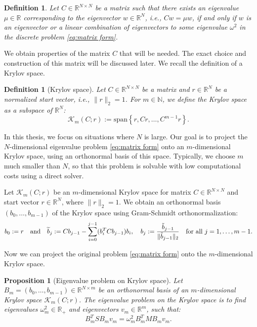 \documentclass[a4paper,11pt,bibliography=totoc,listof=totoc,headinclude=true,cleardoublepage=empty,oneside]{scrbook}
\newtheorem{definition}[theorem]{Definition}
\newtheorem{prop}[theorem]{Proposition}
\newcommand{\R}{\mathbb{R}}
\newcommand{\N}{\mathbb{N}}
\begin{document}
\begin{definition}\label{def:C}
    Let $C \in \R^{N\times N}$ be a matrix such that there exists an eigenvalue $\mu \in \R$ corresponding to the eigenvector $w\in \R^N$, i.e., $Cw = \mu w$, if and only if $w$ is an eigenvector or a linear combination of eigenvectors to some eigenvalue $\omega^2$ in the discrete problem \eqref{eq:matrix form}.
\end{definition}

We obtain properties of the matrix $C$ that will be needed. The exact choice and construction of this matrix will be discussed later. We recall the definition of a Krylov space.

\begin{definition}[Krylov space]
    Let $C \in \R^{N \times N}$ be a matrix and $r\in \R^N$ be a normalized start vector, i.e., $\|r\|_2=1$. For $m\in \N$, we define the Krylov space as a subspace of $\R^N$:
    \begin{equation*}
        \mathcal{K}_m(C; r) := \mathrm{span}\left\{r, Cr, \dots, C^{m-1}r\right\}.
    \end{equation*}
\end{definition}

In this thesis, we focus on situations where $N$ is large. Our goal is to project the $N$-dimensional eigenvalue problem \eqref{eq:matrix form} onto an $m$-dimensional Krylov space, using an orthonormal basis of this space. Typically, we choose $m$ much smaller than $N$, so that this problem is solvable with low computational costs using a direct solver.

Let $\mathcal{K}_m(C; r)$ be an $m$-dimensional Krylov space for matrix $C\in \R^{N\times N}$ and start vector $r\in \R^N$, where $\|r\|_2=1$. We obtain an orthonormal basis $(b_0, \dots, b_{m-1})$ of the Krylov space using Gram-Schmidt orthonormalization:
\begin{equation*}
    b_0 := r \quad \text{and} \quad \widetilde{b}_{j} := Cb_{j-1} - \sum_{i=0}^{j-1} (b_i^T C b_{j-1}) b_i, \quad b_j := \frac{\Tilde{b}_{j-1}}{\|\Tilde{b}_{j-1}\|_2} \quad \text{for all } j=1, \dots, m-1. 
\end{equation*}


Now we can project the original problem \eqref{eq:matrix form} onto the $m$-dimensional Krylov space.

\begin{prop}[Eigenvalue problem on Krylov space]
    Let $B_m = (b_0, \dots, b_{m-1}) \in \R^{N\times m}$ be an orthonormal basis of an $m$-dimensional Krylov space $\mathcal{K}_m(C; r)$. The eigenvalue problem on the Krylov space is to find eigenvalues $\omega_m^2 \in \R_+$ and eigenvectors $v_m\in\R^m$, such that:
    \begin{equation}\label{eq:Krylov problem}
        B_m^T S B_m v_m = \omega_m^2 B_m^T M B_m v_m.
    \end{equation}
\end{prop}
\end{document}
